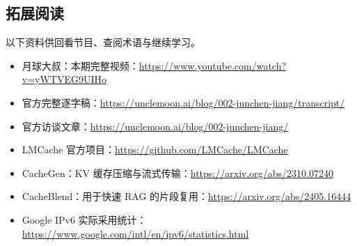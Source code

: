 \documentclass[UTF8,a4paper,11pt,fontset=fandol]{ctexart}
\begin{document}
\subsection{拓展阅读}
以下资料供回看节目、查阅术语与继续学习。
\begin{itemize}
\item 月球大叔：本期完整视频：\url{https://www.youtube.com/watch?v=yWTVEG9UIHo}
\item 官方完整逐字稿：\url{https://unclemoon.ai/blog/002-junchen-jiang/transcript/}
\item 官方访谈文章：\url{https://unclemoon.ai/blog/002-junchen-jiang/}
\item LMCache 官方项目：\url{https://github.com/LMCache/LMCache}
\item CacheGen：KV 缓存压缩与流式传输：\url{https://arxiv.org/abs/2310.07240}
\item CacheBlend：用于快速 RAG 的片段复用：\url{https://arxiv.org/abs/2405.16444}
\item Google IPv6 实际采用统计：\url{https://www.google.com/intl/en/ipv6/statistics.html}
\end{itemize}
\end{document}
